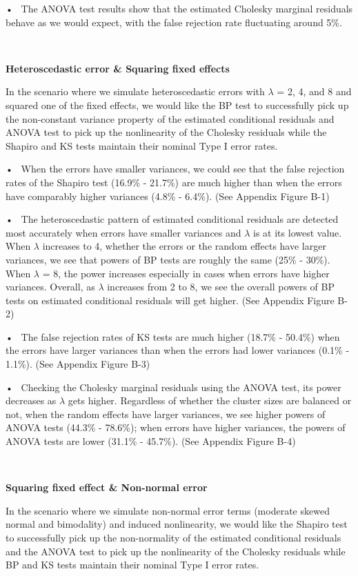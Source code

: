 \documentclass[12pt]{article}
\begin{document}
• ~The ANOVA test results show that the estimated Cholesky marginal
residuals behave as we would expect, with the false rejection rate
fluctuating around 5\%.

~

\textbf{Heteroscedastic error \& Squaring fixed effects}

In the scenario where we simulate heteroscedastic errors with
\(\lambda\) = 2, 4, and 8 and squared one of the fixed effects, we would
like the BP test to successfully pick up the non-constant variance
property of the estimated conditional residuals and ANOVA test to pick
up the nonlinearity of the Cholesky residuals while the Shapiro and KS
tests maintain their nominal Type I error rates.

• ~When the errors have smaller variances, we could see that the false
rejection rates of the Shapiro test (16.9\% - 21.7\%) are much higher
than when the errors have comparably higher variances (4.8\% - 6.4\%).
(See Appendix Figure B-1)

• ~The heteroscedastic pattern of estimated conditional residuals are
detected most accurately when errors have smaller variances and
\(\lambda\) is at its lowest value. When \(\lambda\) increases to 4,
whether the errors or the random effects have larger variances, we see
that powers of BP tests are roughly the same (25\% - 30\%). When
\(\lambda\) = 8, the power increases especially in cases when errors
have higher variances. Overall, as \(\lambda\) increases from 2 to 8, we
see the overall powers of BP tests on estimated conditional residuals
will get higher. (See Appendix Figure B-2)

• ~The false rejection rates of KS tests are much higher (18.7\% -
50.4\%) when the errors have larger variances than when the errors had
lower variances (0.1\% - 1.1\%). (See Appendix Figure B-3)

• ~Checking the Cholesky marginal residuals using the ANOVA test, its
power decreases as \(\lambda\) gets higher. Regardless of whether the
cluster sizes are balanced or not, when the random effects have larger
variances, we see higher powers of ANOVA tests (44.3\% - 78.6\%); when
errors have higher variances, the powers of ANOVA tests are lower
(31.1\% - 45.7\%). (See Appendix Figure B-4)

~

\textbf{Squaring fixed effect \& Non-normal error}

In the scenario where we simulate non-normal error terms (moderate
skewed normal and bimodality) and induced nonlinearity, we would like
the Shapiro test to successfully pick up the non-normality of the
estimated conditional residuals and the ANOVA test to pick up the
nonlinearity of the Cholesky residuals while BP and KS tests maintain
their nominal Type I error rates.
\end{document}
